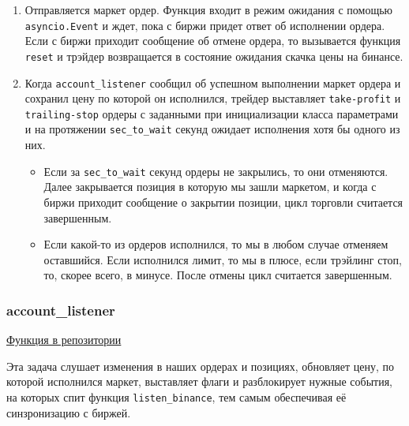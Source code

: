\begin{enumerate}
    \item Отправляется маркет ордер. Функция входит в режим ожидания с помощью \texttt{asyncio.Event} и ждет, пока с биржи придет ответ об исполнении ордера. Если с биржи приходит сообщение об отмене ордера, то вызывается функция \texttt{reset} и трэйдер возвращается в состояние ожидания скачка цены на бинансе.
    \item Когда \texttt{account\_listener} сообщил об успешном выполнении маркет ордера и сохранил цену по которой он исполнился, трейдер выставляет \texttt{take-profit} и \texttt{trailing-stop} ордеры с заданными при инициализации класса параметрами и на протяжении \texttt{sec\_to\_wait} секунд ожидает исполнения хотя бы одного из них.
    \begin{itemize}
        \item Если за \texttt{sec\_to\_wait} секунд ордеры не закрылись, то они отменяются. Далее закрывается позиция в которую мы зашли маркетом, и когда с биржи приходит сообщение о закрытии позиции, цикл торговли считается завершенным.
        \item Если какой-то из ордеров исполнился, то мы в любом случае отменяем оставшийся. Если исполнился лимит, то мы в плюсе, если трэйлинг стоп, то, скорее всего, в минусе. После отмены цикл считается завершенным.
    \end{itemize}
    
\end{enumerate}


\subsubsection{account\_listener}

\href{https://github.com/dexety/dex-trading-system/blob/main/research/ib-0002-cross-analysis/trader.py#L365}{Функция в репозитории}

Эта задача слушает изменения в наших ордерах и позициях, обновляет цену, по которой исполнился маркет, выставляет флаги и разблокирует нужные события, на которых спит функция \texttt{listen\_binance}, тем самым обеспечивая её синзронизацию с биржей.
